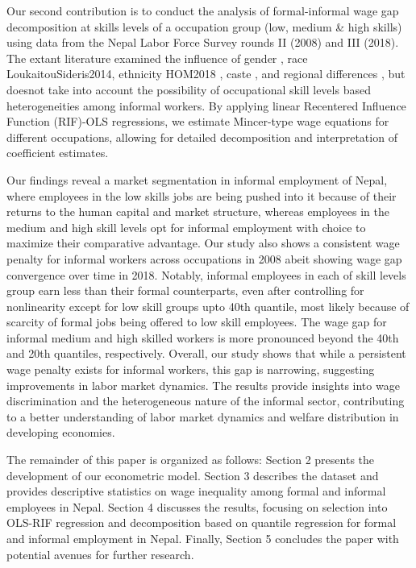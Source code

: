 Our second contribution is to conduct the analysis of formal-informal wage gap decomposition 
at skills levels of a occupation group (low, medium \& high skills) using data from the Nepal Labor Force Survey rounds II (2008) and III (2018). The extant literature examined the  influence of gender \parencite{Chen2001, Chen2004, Sethuraman1998, Yahmed2016} , race LoukaitouSideris2014, ethnicity HOM2018 , caste \parencite{Agarwala2013} , and regional differences \parencite{Garcia2017}, but doesnot take into account the possibility of occupational skill levels based heterogeneities among informal workers. By applying linear Recentered Influence Function (RIF)-OLS regressions, we estimate Mincer-type wage equations for different occupations, allowing for detailed decomposition and interpretation of coefficient estimates.

Our findings reveal a  market segmentation in informal employment of Nepal, where employees in the low skills jobs are being pushed into it because of their returns to the human capital and market structure, whereas employees in the medium and high skill levels opt for informal employment with choice to maximize their comparative advantage.  Our study also shows a consistent wage penalty for informal workers across occupations in 2008 abeit showing wage  gap convergence over time in 2018. Notably, informal employees in each of skill levels group earn less than their formal counterparts, even after controlling for nonlinearity except for low skill groups upto 40th quantile, most likely because of scarcity of formal jobs being offered to low skill employees.  The wage gap for informal medium and high skilled workers is more pronounced beyond the 40th and 20th quantiles, respectively. Overall, our study shows that while a persistent wage penalty exists for informal workers, this gap is narrowing, suggesting improvements in labor market dynamics. The results provide insights into wage discrimination and the heterogeneous nature of the informal sector, contributing to a better understanding of labor market dynamics and welfare distribution in developing economies.

The remainder of this paper is organized as follows: Section 2 presents the development of our econometric model. Section 3 describes the dataset and provides descriptive statistics on wage inequality among formal and informal employees in Nepal. Section 4 discusses the results, focusing on selection into OLS-RIF regression and decomposition based on quantile regression for formal and informal employment in Nepal. Finally, Section 5 concludes the paper with potential avenues for further research.